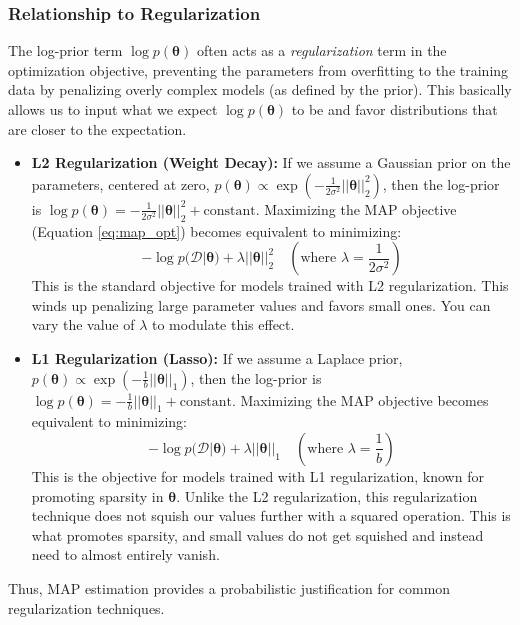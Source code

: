\documentclass{article}
\begin{document}
\subsubsection{Relationship to Regularization}
The log-prior term $\log p(\bm{\theta})$ often acts as a \emph{regularization} term in the optimization objective, preventing the parameters from overfitting to the training data by penalizing overly complex models (as defined by the prior). This basically allows us to input what we expect $\log p(\bm{\theta})$ to be and favor distributions that are closer to the expectation.
\begin{itemize}
    \item \textbf{L2 Regularization (Weight Decay):} If we assume a Gaussian prior on the parameters, centered at zero, $p(\bm{\theta}) \propto \exp\left(-\frac{1}{2\sigma^2} ||\bm{\theta}||_2^2\right)$, then the log-prior is $\log p(\bm{\theta}) = -\frac{1}{2\sigma^2} ||\bm{\theta}||_2^2 + \text{constant}$. Maximizing the MAP objective (Equation \ref{eq:map_opt}) becomes equivalent to minimizing:
    \begin{equation}
        -\log p(\mathcal{D} | \bm{\theta}) + \lambda ||\bm{\theta}||_2^2 \quad (\text{where } \lambda = \frac{1}{2\sigma^2})
    \end{equation}
    This is the standard objective for models trained with L2 regularization. This winds up penalizing large parameter values and favors small ones. You can vary the value of $\lambda$ to modulate this effect.
    \item \textbf{L1 Regularization (Lasso):} If we assume a Laplace prior, $p(\bm{\theta}) \propto \exp\left(-\frac{1}{b} ||\bm{\theta}||_1\right)$, then the log-prior is $\log p(\bm{\theta}) = -\frac{1}{b} ||\bm{\theta}||_1 + \text{constant}$. Maximizing the MAP objective becomes equivalent to minimizing:
    \begin{equation}
        -\log p(\mathcal{D} | \bm{\theta}) + \lambda ||\bm{\theta}||_1 \quad (\text{where } \lambda = \frac{1}{b})
    \end{equation}
    This is the objective for models trained with L1 regularization, known for promoting sparsity in $\bm{\theta}$. Unlike the L2 regularization, this regularization technique does not squish our values further with a squared operation. This is what promotes sparsity, and small values do not get squished and instead need to almost entirely vanish.
\end{itemize}
Thus, MAP estimation provides a probabilistic justification for common regularization techniques.
\end{document}
